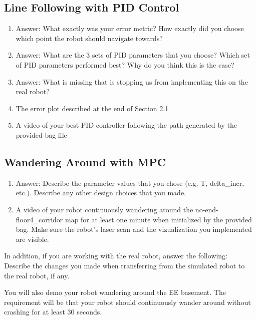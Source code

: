 \documentclass[final]{article}
\begin{document}
\subsection{Line Following with PID Control}
\begin{enumerate}
\item Answer: What exactly was your error metric? How exactly did you choose which point the robot should navigate towards?
\item Answer: What are the 3 sets of PID parameters that you choose? Which set of PID parameters performed best? Why do you think this is the case?
\item Answer: What is missing that is stopping us from implementing this on the real robot?
\item The error plot described at the end of Section 2.1
\item A video of your best PID controller following the path generated by the provided bag file

\end{enumerate}

\subsection{Wandering Around with MPC}
\begin{enumerate}
\item Answer: Describe the parameter values that you chose (e.g. T, delta\_incr, etc.). Describe any other design choices that you made.
\item A video of your robot continuously wandering around the no-end-floor4\_corridor map for at least one minute when initialized by the provided bag. Make sure the robot's laser scan and the vizualization you implemented are visible.
\end{enumerate}

In addition, if you are working with the real robot, answer the following: \\
Describe the changes you made when transferring from the simulated robot to the real robot, if any.

You will also demo your robot wandering around the EE basement. The requirement will be that your robot should continuously wander around without crashing for at least 30 seconds. 
\end{document}
